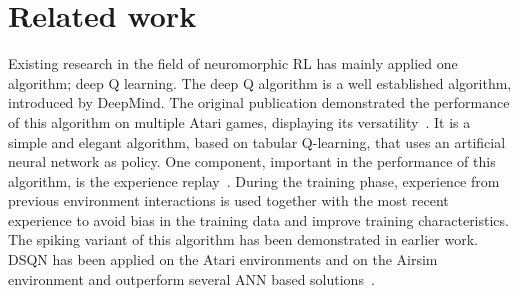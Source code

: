 \section{Related work} \label{section:lit_review} 
Existing research in the field of neuromorphic RL has mainly applied one algorithm; deep Q learning. The deep Q algorithm is a well established algorithm, introduced by DeepMind. The original publication demonstrated the performance of this algorithm on multiple Atari games, displaying its versatility~\cite{mnih2013playing}. It is a simple and elegant algorithm, based on tabular Q-learning, that uses an artificial neural network as policy. One component, important in the performance of this algorithm, is the experience replay~\cite{fedus_revisiting_2020}. During the training phase, experience from previous environment interactions is used together with the most recent experience to avoid bias in the training data and improve training characteristics. The spiking variant of this algorithm has been demonstrated in earlier work. DSQN has been applied on the Atari environments and on the Airsim environment and outperform several ANN based solutions~\cite{DSQN_Atari, DQN_Atari_human-level_2022, DSQN_AirSim}.  
\\ 

